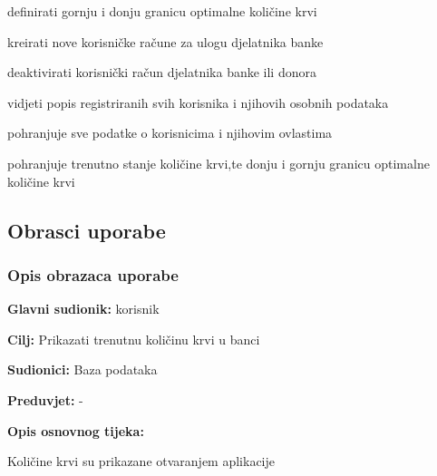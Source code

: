 \begin{packed_enum}
\begin{packed_enum}
		\item definirati gornju i donju granicu optimalne količine krvi
		\item kreirati nove korisničke račune za ulogu djelatnika banke
		\item deaktivirati korisnički račun djelatnika banke ili donora
		\item vidjeti popis registriranih svih korisnika i njihovih osobnih podataka
		
	\end{packed_enum}
	
	\item  {}
	
	\begin{packed_enum}
		
		\item pohranjuje sve podatke o korisnicima i njihovim ovlastima
		\item pohranjuje trenutno stanje količine krvi,te donju i gornju granicu optimalne količine krvi
		
	\end{packed_enum}
\end{packed_enum}

\eject 



\subsection{Obrasci uporabe}

\subsubsection{Opis obrazaca uporabe}


\noindent {}
					\begin{packed_item}
	
						\item \textbf{Glavni sudionik: }korisnik
						\item \textbf{Cilj:} Prikazati trenutnu količinu krvi u banci
						\item \textbf{Sudionici:} Baza podataka
						\item \textbf{Preduvjet:} -
						\item \textbf{Opis osnovnog tijeka:}
						
						\item[] \begin{packed_enum}
	
							\item Količine krvi su prikazane otvaranjem aplikacije
							
						\end{packed_enum}

					\end{packed_item}

